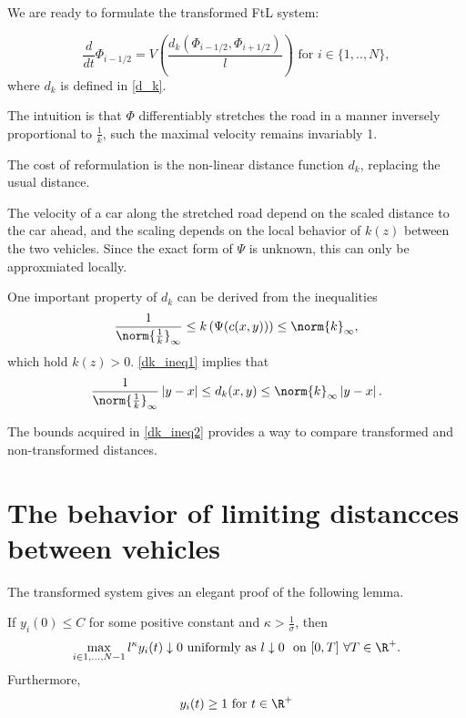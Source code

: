 We are ready to formulate the transformed FtL system:

\begin{equation}\label{FtL_transformed2}  
   \frac{d}{dt} \Phi_{i-1/2}  = V\left(\frac{d_k(\Phi_{i-1/2}, \Phi_{i+1/2})}{l}\right) \text{ for } i \in \{1,..,N\},
\end{equation}
where $d_k$ is defined in \eqref{d_k}. 


The intuition is that $\Phi$ differentiably stretches the road in a manner inversely proportional to $\frac{1}{k}$, such the maximal velocity remains invariably 1. 

The cost of reformulation is the non-linear distance function $d_k$, replacing the usual distance. 

The velocity of a car along the stretched road depend on the scaled distance to the car ahead, and the scaling depends on the local behavior of $k(z)$ between the two vehicles. Since the exact form of $\Psi$ is unknown, this can only be approxmiated locally. %

One important property of $d_k$ can be derived from the inequalities 
\begin{equation} \label{dk_ineq1}
	\frac{1}{\norm{\frac{1}{k}}_\infty} \leq k\left(\Psi(c(x,y))\right) \leq \norm{k}_\infty, 
\end{equation} 
which hold $k(z) > 0$. \eqref{dk_ineq1} implies that 
\begin{align} \label{dk_ineq2}
	\frac{1}{\norm{\frac{1}{k}}_\infty} \left| y - x\right| \leq d_k(x,y)  \leq  \norm{k}_\infty \left| y - x\right|. 
\end{align}

The bounds acquired in \eqref{dk_ineq2} provides a way to compare transformed and non-transformed distances.


\section{The behavior of limiting distancces between vehicles} \label{section:distance_cars}

The transformed system gives an elegant proof of the following lemma. 
\begin{lemma} \label{lemma:boundY}
	If $y_i(0) \leq C$ for some positive constant and $\kappa > \frac{1}{\sigma}$, then 
	\begin{equation}
		\max_{i \in {1,...,N-1}} l^\kappa y_i(t) \downarrow 0\text{ uniformly as } l \downarrow 0 \, \, \text{ on } [0,T] \,\, \forall T \in \R^+. 
	\end{equation}
	Furthermore, 
	\begin{equation}
		y_i(t) \geq 1 \text{ for } t \in \R^+
 	\end{equation}
\end{lemma}



